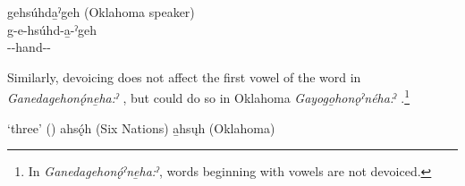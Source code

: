 \ex gehsúhda̱ˀgeh (Oklahoma speaker)\\\label{ex:handb}
\gll g-e-hsúhd-a̱-ˀgeh\\
-{\joinerE}-hand-{\joinerA}-{\on}\\
\z
\z

Similarly, devoicing does not affect the first vowel of the word in \textit{Ganedage\-honǫ́ne̱ha:ˀ} , but could do so in Oklahoma \textit{Gayogo̱honǫˀnéha:}ˀ .\footnote{In \textit{Ganedagehonǫ́ˀne̱ha:ˀ}, words beginning with vowels are not devoiced.}

\ea \label{ex:three} ‘three’ (\cite[254]{mithun_incipient_1989})
\ea ahsǫ́h (Six Nations)\label{ex:threea} 
\ex a̱hsųh (Oklahoma)\label{ex:threeb} 
\z
\z
